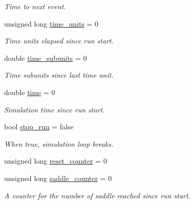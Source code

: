 \begin{DoxyCompactItemize}
\begin{DoxyCompactList}\small\item\em Time to next event. \end{DoxyCompactList}\item 
\hypertarget{classLifNetSim_a5fe7b525f0660517c94f8ed28d5bf50d}{unsigned long \hyperlink{classLifNetSim_a5fe7b525f0660517c94f8ed28d5bf50d}{time\-\_\-units} = 0}\label{classLifNetSim_a5fe7b525f0660517c94f8ed28d5bf50d}

\begin{DoxyCompactList}\small\item\em Time units elapsed since run start. \end{DoxyCompactList}\item 
\hypertarget{classLifNetSim_aac7ffbe0f159c3b7dfcad41e821984f6}{double \hyperlink{classLifNetSim_aac7ffbe0f159c3b7dfcad41e821984f6}{time\-\_\-subunits} = 0}\label{classLifNetSim_aac7ffbe0f159c3b7dfcad41e821984f6}

\begin{DoxyCompactList}\small\item\em Time subunits since last time unit. \end{DoxyCompactList}\item 
\hypertarget{classLifNetSim_a2bdf758ccdb5273b1bb527457c979f4a}{double \hyperlink{classLifNetSim_a2bdf758ccdb5273b1bb527457c979f4a}{time} = 0}\label{classLifNetSim_a2bdf758ccdb5273b1bb527457c979f4a}

\begin{DoxyCompactList}\small\item\em Simulation time since run start. \end{DoxyCompactList}\item 
\hypertarget{classLifNetSim_a810a3a633dd3d53de8af374579a9367e}{bool \hyperlink{classLifNetSim_a810a3a633dd3d53de8af374579a9367e}{stop\-\_\-run} = false}\label{classLifNetSim_a810a3a633dd3d53de8af374579a9367e}

\begin{DoxyCompactList}\small\item\em When true, simulation loop breaks. \end{DoxyCompactList}\item 
unsigned long \hyperlink{classLifNetSim_a2f3f9325c55f056f06f07ebd0244a1c3}{reset\-\_\-counter} = 0
\item 
\hypertarget{classLifNetSim_acca6feadac5c19ae605b6571b6b3cd44}{unsigned long \hyperlink{classLifNetSim_acca6feadac5c19ae605b6571b6b3cd44}{saddle\-\_\-counter} = 0}\label{classLifNetSim_acca6feadac5c19ae605b6571b6b3cd44}

\begin{DoxyCompactList}\small\item\em A counter for the number of saddle reached since run start. \end{DoxyCompactList}\end{DoxyCompactItemize}
